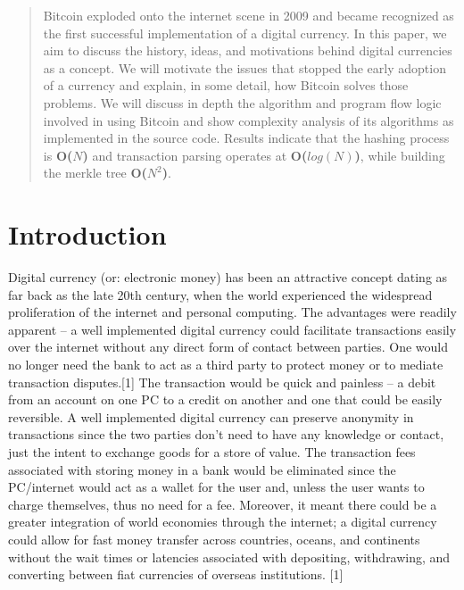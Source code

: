 \documentclass[pdftex,11pt]{article}
\begin{document}


\tableofcontents
\newpage

\begin{abstract}
Bitcoin exploded onto the internet scene in 2009 and became recognized as the first successful implementation of a digital currency. In this paper, we aim to discuss the history, ideas, and motivations behind digital currencies as a concept. We will motivate the issues that stopped the early adoption of a currency and explain, in some detail, how Bitcoin solves those problems. We will discuss in depth the algorithm and program flow logic involved in using Bitcoin and show complexity analysis of its algorithms as implemented in the source code. Results indicate that the hashing process is {\bf O($N$)} and transaction parsing operates at {\bf O($log(N)$)}, while building the merkle tree {\bf O($N^2$)}. 
\end{abstract}

\section{Introduction}
Digital currency (or: electronic money) has been an attractive concept dating as far back as the late 20th century, when the world experienced the widespread proliferation of the internet and personal computing. The advantages were readily apparent --  a well implemented digital currency could facilitate transactions easily over the internet without any direct form of contact between parties. One would no longer need the bank to act as a third party to protect money or to mediate transaction disputes.[1] The transaction would be quick and painless -- a debit from an account on one PC to a credit on another and one that could be easily reversible. A well implemented digital currency can preserve anonymity in transactions since the two parties don't need to have any knowledge or contact, just the intent to exchange goods for a store of value. The transaction fees associated with storing money in a bank would be eliminated since the PC/internet would act as a wallet for the user and, unless the user wants to charge themselves, thus no need for a fee. Moreover, it meant there could be a greater integration of world economies through the internet; a digital currency could allow for fast money transfer across countries, oceans, and continents without the wait times or latencies associated with depositing, withdrawing, and converting between fiat currencies of overseas institutions. [1]
\end{document}
